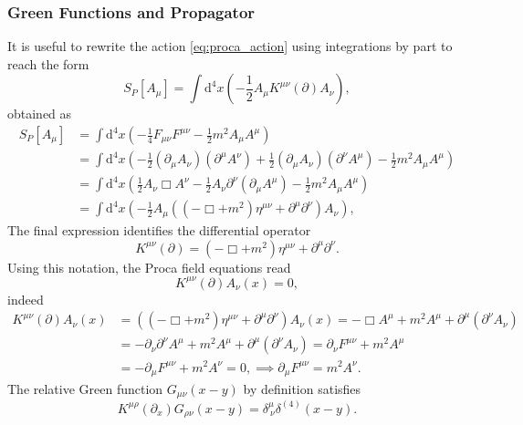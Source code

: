 \subsubsection{Green Functions and Propagator}
It is useful to rewrite the action \eqref{eq:proca_action} using integrations by part to reach the form
\[
    S_P[A_\mu] = \int \mathrm{d}^4 x \left( -\frac{1}{2} A_\mu K^{\mu \nu}(\partial) A_\nu \right),
\]
obtained as
\[
    \begin{aligned}
        S_P[A_\mu] & = \int \mathrm{d}^4 x \left( -\frac{1}{4} F_{\mu \nu} F^{\mu \nu} - \frac{1}{2} m^2 A_\mu A^{\mu} \right)                                                                                 \\
                   & = \int \mathrm{d}^4 x \left( -\frac{1}{2} (\partial_\mu A_\nu)(\partial^{\mu} A^{\nu}) + \frac{1}{2} (\partial_\mu A_\nu)(\partial^{\nu} A^{\mu}) - \frac{1}{2} m^2 A_\mu A^{\mu} \right) \\
                   & = \int \mathrm{d}^4 x \left( \frac{1}{2} A_\nu \Box A^{\nu} - \frac{1}{2} A_\nu \partial^{\nu} (\partial_{\mu} A^{\mu}) - \frac{1}{2} m^2 A_\mu A^{\mu} \right)                           \\
                   & = \int \mathrm{d}^4 x \left( -\frac{1}{2} A_\mu \left( (-\Box + m^2) \eta^{\mu \nu} + \partial^{\mu}\partial^{\nu} \right) A_\nu \right),
    \end{aligned}
\]
The final expression identifies the differential operator
\[
    K^{\mu \nu}(\partial) = (-\Box + m^2)\eta^{\mu \nu} + \partial^{\mu}\partial^{\nu}.
\]
Using this notation, the Proca field equations read
\[
    K^{\mu \nu}(\partial) A_\nu(x) = 0,
\]
indeed
\[
    \begin{aligned}
        K^{\mu \nu}(\partial) A_\nu(x) & = \left( (-\Box + m^2)\eta^{\mu \nu} + \partial^{\mu}\partial^{\nu} \right) A_\nu(x) = -\Box A^{\mu} + m^2 A^{\mu} + \partial^{\mu} (\partial^{\nu} A_\nu) \\
                                       & = - \partial_\nu \partial^{\nu} A^{\mu} + m^2 A^{\mu} + \partial^{\mu} (\partial^{\nu} A_\nu) = \partial_{\nu} F^{\mu \nu} + m^2 A^{\mu}                   \\
                                       & = -\partial_\mu F^{\mu \nu} + m^2 A^{\nu} = 0, \implies \partial_\mu F^{\mu \nu} = m^2 A^{\nu}.
    \end{aligned}
\]
The relative Green function \(G_{\mu \nu}(x-y)\) by definition satisfies
\begin{equation}
    K^{\mu \rho}(\partial_x) G_{\rho \nu}(x-y) = \delta^{\mu}_{\ \nu} \delta^{(4)}(x-y).
    \label{eq:proca_green_function_definition}
\end{equation}
